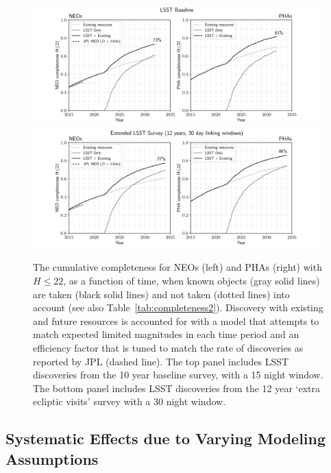 \begin{figure}[t!]
\centering
\includegraphics[width=0.99\textwidth]{figures/neo_pha_completeness_3in15_minion_1016.pdf} \\
\includegraphics[width=0.99\textwidth]{figures/neo_pha_completeness_3in30_astro_lsst_01_1016.pdf}
\vskip -0.2in
\caption{The cumulative completeness for NEOs (left) and PHAs (right) with $H\le22$, as a function of
time, when known objects (gray solid lines) are taken (black solid lines) and not taken (dotted lines)
into  account (see also Table~\ref{tab:completeness2}). Discovery with existing and future resources 
is accounted for with a model that attempts to match expected limited magnitudes in each time period
and an efficiency factor that is tuned to match the rate of discoveries as reported by JPL (dashed line). 
The top panel includes LSST discoveries from the 10 year baseline survey, with a 15 night window.
The bottom panel includes LSST discoveries from the 12 year 	`extra ecliptic visits' survey with a 30 night window.
\label{fig:knownObj}}
\end{figure}



\subsection{Systematic Effects due to Varying Modeling Assumptions \label{sec:syseff}}

